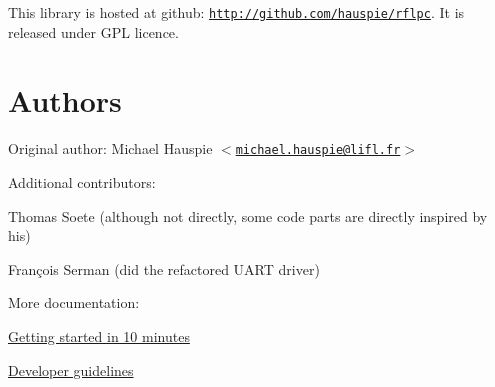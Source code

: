 This library is hosted at github\-: \href{http://github.com/hauspie/rflpc}{\tt http\-://github.\-com/hauspie/rflpc}. It is released under G\-P\-L licence. \hypertarget{index_Authors}{}\section{Authors}\label{index_Authors}

\begin{DoxyItemize}
\item Original author\-: Michael Hauspie {\ttfamily $<$\href{mailto:michael.hauspie@lifl.fr}{\tt michael.\-hauspie@lifl.\-fr}$>$}
\item Additional contributors\-:
\begin{DoxyItemize}
\item Thomas Soete (although not directly, some code parts are directly inspired by his)
\item François Serman (did the refactored U\-A\-R\-T driver)
\end{DoxyItemize}
\end{DoxyItemize}

More documentation\-:
\begin{DoxyItemize}
\item \hyperlink{start}{Getting started in 10 minutes}
\item \hyperlink{guidelines}{Developer guidelines} 
\end{DoxyItemize}